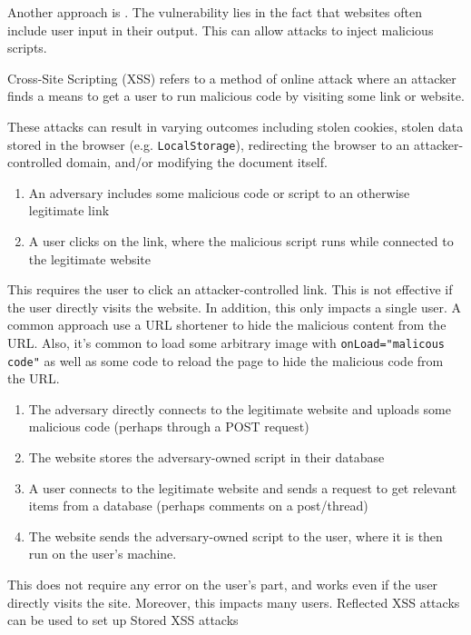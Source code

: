 Another approach is . The vulnerability lies in the fact that websites often include user input in their output. This can allow attacks to inject malicious scripts.

\begin{dfnbox}{Cross-Site Scripting (XSS)}{}
     refers to a method of online attack where an attacker finds a means to get a user to run malicious code by visiting some link or website.
\end{dfnbox}

These attacks can result in varying outcomes including stolen cookies, stolen data stored in the browser (e.g. \texttt{LocalStorage}), redirecting the browser to an attacker-controlled domain, and/or modifying the document itself.

\begin{enumerate}
    \item An adversary includes some malicious code or script to an otherwise legitimate link
    \item A user clicks on the link, where the malicious script runs while connected to the legitimate website
\end{enumerate}

This requires the user to click an attacker-controlled link. This is not effective if the user directly visits the website. In addition, this only impacts a single user. A common approach use a URL shortener to hide the malicious content from the URL. Also, it's common to load some arbitrary image with \texttt{onLoad="malicous code"} as well as some code to reload the page to hide the malicious code from the URL.

\begin{enumerate}
    \item The adversary directly connects to the legitimate website and uploads some malicious code (perhaps through a POST request)
    \item The website stores the adversary-owned script in their database
    \item A user connects to the legitimate website and sends a request to get relevant items from a database (perhaps comments on a post/thread)
    \item The website sends the adversary-owned script to the user, where it is then run on the user's machine.
\end{enumerate}

This does not require any error on the user's part, and works even if the user directly visits the site. Moreover, this impacts many users. Reflected XSS attacks can be used to set up Stored XSS attacks


